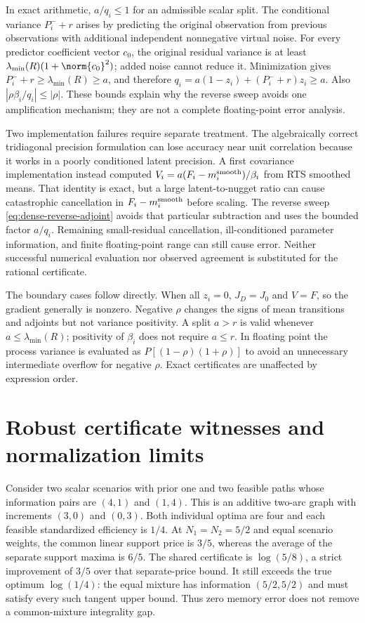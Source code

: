 In exact arithmetic, $a/q_i\le1$ for an admissible scalar split.
The conditional variance $P_i^-+r$ arises by predicting the original
observation from previous observations with additional independent
nonnegative virtual noise. For every predictor coefficient vector $c_0$,
the original residual variance is at least
$\lambda_{\min}(R)(1+\norm{c_0}^2)$; added noise cannot reduce it.
Minimization gives $P_i^-+r\ge\lambda_{\min}(R)\ge a$, and therefore
$q_i=a(1-z_i)+(P_i^-+r)z_i\ge a$.
Also $|\rho\beta_i/q_i|\le|\rho|$.
These bounds explain why the reverse sweep avoids one amplification mechanism;
they are not a complete floating-point error analysis.

Two implementation failures require separate treatment. The algebraically
correct tridiagonal precision formulation can lose accuracy near unit
correlation because it works in a poorly conditioned latent precision.
A first covariance implementation instead computed
$V_i=a(F_i-m_i^{\rm smooth})/\beta_i$ from RTS smoothed means. That identity
is exact, but a large latent-to-nugget ratio can cause catastrophic
cancellation in $F_i-m_i^{\rm smooth}$ before scaling. The reverse sweep
\eqref{eq:dense-reverse-adjoint} avoids that particular subtraction and
uses the bounded factor $a/q_i$. Remaining small-residual cancellation,
ill-conditioned parameter information, and finite floating-point range can
still cause error. Neither successful numerical evaluation nor observed
agreement is substituted for the rational certificate.

The boundary cases follow directly. When all $z_i=0$, $J_D=J_0$ and $V=F$,
so the gradient generally is nonzero. Negative $\rho$ changes the signs of
mean transitions and adjoints but not variance positivity. A split $a>r$
is valid whenever $a\le\lambda_{\min}(R)$; positivity of $\beta_i$ does
not require $a\le r$. In floating point the process variance is evaluated
as $P[(1-\rho)(1+\rho)]$ to avoid an unnecessary intermediate overflow
for negative $\rho$. Exact certificates are unaffected by expression order.

\section{Robust certificate witnesses and normalization limits}
\label{app:robust-witnesses}

Consider two scalar scenarios with prior one and two feasible paths whose
information pairs are $(4,1)$ and $(1,4)$. This is an additive two-arc graph
with increments $(3,0)$ and $(0,3)$. Both individual optima are four and each
feasible standardized efficiency is $1/4$. At $N_1=N_2=5/2$ and equal
scenario weights, the common linear support price is $3/5$, whereas the
average of the separate support maxima is $6/5$. The shared certificate is
$\log(5/8)$, a strict improvement of $3/5$ over that separate-price bound.
It still exceeds the true optimum $\log(1/4)$: the equal mixture has
information $(5/2,5/2)$ and must satisfy every such tangent upper bound.
Thus zero memory error does not remove a common-mixture integrality gap.

